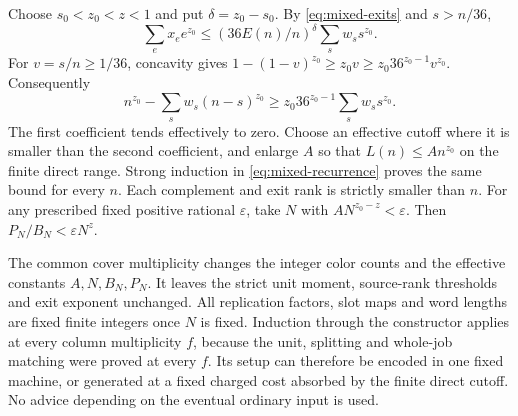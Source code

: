 Choose $s_0<z_0<z<1$ and put $\delta=z_0-s_0$. By
\eqref{eq:mixed-exits} and $s>n/36$,
\[
 \sum_e x_ee^{z_0}
 \le(36E(n)/n)^\delta\sum_s w_ss^{z_0}.
\]
For $v=s/n\ge1/36$, concavity gives
$1-(1-v)^{z_0}\ge z_0v\ge z_0 36^{z_0-1}v^{z_0}$.
Consequently
\[
 n^{z_0}-\sum_s w_s(n-s)^{z_0}
 \ge z_0 36^{z_0-1}\sum_s w_ss^{z_0}.
\]
The first coefficient tends effectively to zero. Choose an effective
cutoff where it is smaller than the second coefficient, and enlarge
$A$ so that $L(n)\le A n^{z_0}$ on the finite direct range. Strong
induction in \eqref{eq:mixed-recurrence} proves the same bound for
every $n$. Each complement and exit rank is strictly smaller than
$n$. For any prescribed fixed positive rational $\varepsilon$, take
$N$ with $AN^{z_0-z}<\varepsilon$. Then
$P_N/B_N<\varepsilon N^z$.

The common cover multiplicity changes the integer color counts and
the effective constants $A,N,B_N,P_N$. It leaves the strict unit
moment, source-rank thresholds and exit exponent unchanged.
All replication factors, slot maps and word lengths are fixed finite
integers once $N$ is fixed. Induction through the constructor applies
at every column multiplicity $f$, because the unit, splitting and
whole-job matching were proved at every $f$. Its setup can therefore
be encoded in one fixed machine, or generated at a fixed charged
cost absorbed by the finite direct cutoff. No advice depending on
the eventual ordinary input is used.
